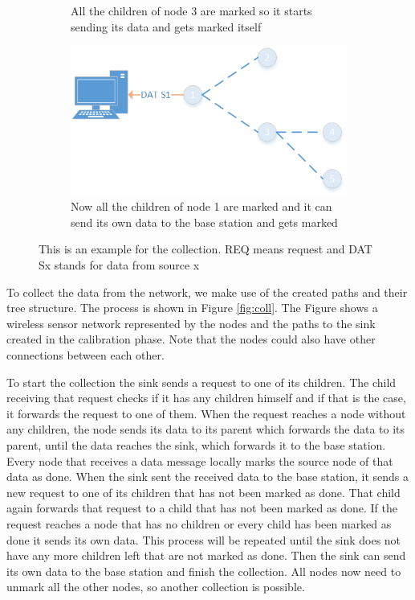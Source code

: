 \begin{figure}[htbp]
\begin{subfigure}[t]{0.4\textwidth}
        \caption{All the children of node 3 are marked so it starts sending its data and gets marked itself}
        \label{fig:coll8}
    \end{subfigure}
    \quad
    \quad
    \begin{subfigure}[t]{0.4\textwidth}
		\centering         
        \includegraphics[scale=0.6]{content/images/Collection/Part9}
        \caption{Now all the children of node 1 are marked and it can send its own data to the base station and gets marked}
        \label{fig:coll9}
    \end{subfigure}
    \caption{This is an example for the collection. REQ means request and DAT Sx stands for data from source x}
\end{figure}

To collect the data from the network, we make use of the created paths and their tree structure. The process is shown in Figure \ref{fig:coll}. The Figure shows a wireless sensor network represented by the nodes and the paths to the sink created in the calibration phase. Note that the nodes could also have other connections between each other. 

To start the collection the sink sends a request to one of its children. The child receiving that request checks if it has any children himself and if that is the case, it forwards the request to one of them. When the request reaches a node without any children, the node sends its data to its parent which forwards the data to its parent, until the data reaches the sink, which forwards it to the base station. Every node that receives a data message locally marks the source node of that data as done. When the sink sent the received data to the base station, it  sends a new request to one of its children that has not been marked as done. That child again forwards that request to a child that has not been marked as done. If the request reaches a node that has no children or every child has been marked as done it sends its own data. This process will be repeated until the sink does not have any more children left that are not marked as done. Then the sink can send its own data to the base station and finish the collection. All nodes now need to unmark all the other nodes, so another collection is possible.


